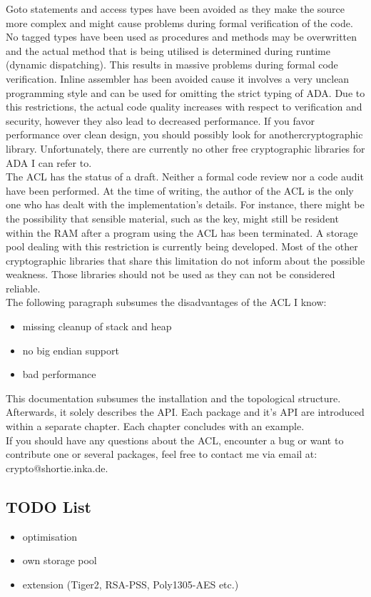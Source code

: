 Goto statements and access types have been avoided as they make the
source more complex and might cause problems during formal verification
of the code. No tagged types have been used as procedures and methods may
be overwritten and the actual method that is being utilised is determined
during runtime (dynamic dispatching). This results in massive problems during
formal code verification. Inline assembler has been avoided cause it involves
a very unclean programming style and can be used for omitting the strict typing
of ADA. Due to this restrictions, the actual code quality increases with
respect to verification and security, however they also lead to decreased
performance. 
If you favor performance over clean design, you should possibly look for
anothercryptographic library. Unfortunately, there are currently no other free 
cryptographic libraries for ADA I can refer to.\\
The ACL has the status of a draft. Neither a formal code review nor a code 
audit have been performed. At the time of writing, the author of the ACL is the
only one who has dealt with the implementation's details.
For instance, there might be the possibility that sensible material, such as 
the key, might still be resident within the RAM after a program using the ACL 
has been terminated. A storage pool dealing with this restriction is currently 
being developed. Most of the other cryptographic libraries that share this 
limitation do not inform about the possible weakness. Those libraries should 
not be used as they can not be considered reliable.\\
The following paragraph subsumes the disadvantages of the ACL I know:
\begin{itemize}
\item missing cleanup of stack and heap
\item no big endian support
\item bad performance
\end{itemize}
This documentation subsumes the installation and the topological structure.
Afterwards, it solely describes the API. Each package and it's API are 
introduced within a separate chapter. Each chapter concludes with an example.\\
If you should have any questions about the ACL, encounter a bug or want to 
contribute one or several packages, feel free to contact me via email at: 
crypto@shortie.inka.de.\\

\subsection{TODO List}
\begin{itemize}
\item optimisation
\item own storage pool
\item extension (Tiger2, RSA-PSS, Poly1305-AES etc.)  
\end{itemize}

